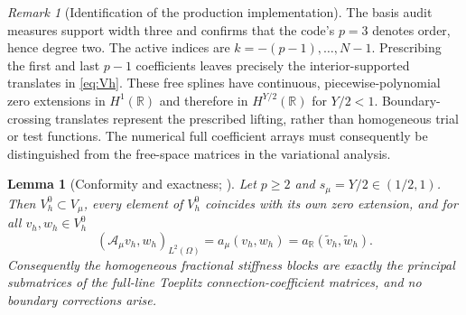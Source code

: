 \documentclass[11pt]{amsart}
\newtheorem{lemma}[theorem]{Lemma}
\theoremstyle{remark}
\newtheorem{remark}[theorem]{Remark}
\newcommand{\R}{\mathbb{R}}
\newcommand{\Vh}{V_h^0}
\newcommand{\Vmu}{V_{\mu}}
\newcommand{\Aop}{\mathcal A_\mu}
\begin{document}
\begin{remark}[Identification of the production implementation]
\label{rem:basis-identification}
The basis audit measures support width three and confirms that the code's
$p=3$ denotes order, hence degree two. The active indices are
$k=-(p-1),\ldots,N-1$. Prescribing the first and last $p-1$ coefficients
leaves precisely the interior-supported translates in \eqref{eq:Vh}.
These free splines have continuous, piecewise-polynomial zero extensions
in $H^1(\mathbb R)$ and therefore in $H^{Y/2}(\mathbb R)$ for $Y/2<1$.
Boundary-crossing translates represent the prescribed lifting, rather than
homogeneous trial or test functions. The numerical full coefficient arrays
must consequently be distinguished from the free-space matrices in the
variational analysis.
\end{remark}

\begin{lemma}[Conformity and exactness; {\cite[Lem.~4.1]{DamircheliCGMY2026}}]
\label{lem:conformity}
Let $p\ge2$ and $s_\mu=Y/2\in(1/2,1)$.  Then $\Vh\subset\Vmu$, every element
of $\Vh$ coincides with its own zero extension, and for all $v_h,w_h\in\Vh$
\begin{equation}
  (\Aop v_h,w_h)_{L^2(\Omega)}=a_\mu(v_h,w_h)=a_\R(\widetilde v_h,\widetilde w_h).
  \label{eq:conformity}
\end{equation}
Consequently the homogeneous fractional stiffness blocks are exactly the
principal submatrices of the full-line Toeplitz connection-coefficient
matrices, and no boundary corrections arise.
\end{lemma}
\end{document}
